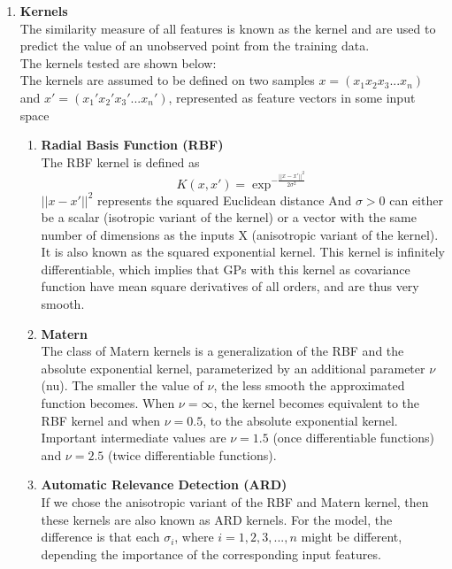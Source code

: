 \documentclass{article}
\begin{document}
\begin{enumerate}
		\item \textbf{Kernels}\\
		The similarity measure of all features is known as the kernel and are used to predict the value of an unobserved point from the training data. \\

		The kernels tested are shown below:\\
		The kernels are assumed to be defined on two samples \( x = ( x_{1} x_{2} x_{3} ... x_{n} ) \) and 
		\( x' = ( {x_{1}}' {x_{2}}' {x_{3}}' ... {x_{n}}')\),  
		represented as feature vectors in some input space\\

		\begin{enumerate}
			\item \textbf{Radial Basis Function (RBF)}\\
			The RBF kernel is defined as 
			\begin{equation}\label{eq:kernel_rbf}
				K(x,x') = \exp^{-\frac{||x-x'||^{2}}{2\sigma^{2}}}
			\end{equation}
			\(||x-x'||^{2}\) represents the squared Euclidean distance 
			And \( \sigma > 0 \) can either be a scalar (isotropic variant of the kernel) or a vector with the same number of dimensions 
			as the inputs X (anisotropic variant of the kernel). \\
			It is also known as the squared exponential kernel. 
			This kernel is infinitely differentiable, which implies that GPs with this kernel as covariance function have mean square derivatives of all orders, 
			and are thus very smooth.
			
			\item \textbf{Matern}\\
			The class of Matern kernels is a generalization of the RBF and the absolute exponential kernel, parameterized 
			by an additional parameter $\nu$ (nu). The smaller the value of $\nu$, the less smooth the approximated function becomes. When $\nu=\infty$, 
			the kernel becomes equivalent to the RBF kernel and when $\nu=0.5$, to the absolute exponential kernel. 
			Important intermediate values are $\nu=1.5$ (once differentiable functions) and $\nu=2.5$ (twice differentiable functions).

			\item \textbf{Automatic Relevance Detection (ARD)}\\
			If we chose the anisotropic variant of the RBF and Matern kernel, then these kernels are also known as ARD kernels.
			For the model, the difference is that each \(\sigma_{i}\), where $i = 1,2,3,...,n$ might be different, 
			depending the importance of the corresponding input features.\\


\end{enumerate}
\end{enumerate}
\end{document}
